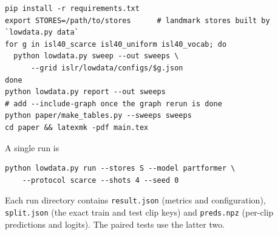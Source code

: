 \documentclass[11pt]{article}
\begin{document}
\begin{verbatim}
pip install -r requirements.txt
export STORES=/path/to/stores      # landmark stores built by `lowdata.py data`
for g in isl40_scarce isl40_uniform isl40_vocab; do
  python lowdata.py sweep --out sweeps \
      --grid islr/lowdata/configs/$g.json
done
python lowdata.py report --out sweeps
# add --include-graph once the graph rerun is done
python paper/make_tables.py --sweeps sweeps
cd paper && latexmk -pdf main.tex
\end{verbatim}

A single run is
\begin{verbatim}
python lowdata.py run --stores S --model partformer \
    --protocol scarce --shots 4 --seed 0
\end{verbatim}
Each run directory contains \texttt{result.json} (metrics and configuration),
\texttt{split.json} (the exact train and test clip keys) and \texttt{preds.npz} (per-clip
predictions and logits). The paired tests use the latter two.
\end{document}
